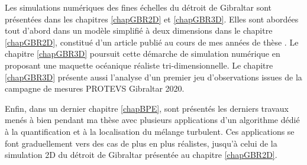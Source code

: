 Les simulations numériques des fines échelles du détroit de Gibraltar sont présentées dans les chapitres \ref{chapGBR2D} et \ref{chapGBR3D}. Elles sont abordées tout d'abord dans un modèle simplifié à deux dimensions dans le chapitre \ref{chapGBR2D}, constitué d'un article publié au cours de mes années de thèse \citep{hilt_2020}. Le chapitre \ref{chapGBR3D} poursuit cette démarche de simulation numérique en proposant une maquette océanique réaliste tri-dimensionnelle. Le chapitre \ref{chapGBR3D} présente aussi l'analyse d'un premier jeu d'observations issues de la campagne de mesures PROTEVS Gibraltar 2020.

Enfin, dans un dernier chapitre \ref{chapBPE}, sont présentés les derniers travaux menés à bien pendant ma thèse avec plusieurs applications d'un algorithme dédié à la quantification et à la localisation du mélange turbulent. Ces applications se font graduellement vers des cas de plus en plus réalistes, jusqu'à celui de la simulation 2D du détroit de Gibraltar présentée au chapitre \ref{chapGBR2D}.

